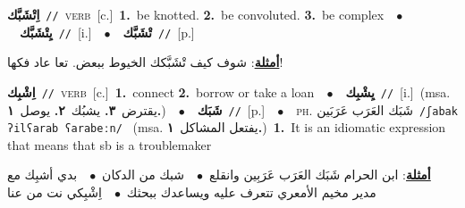\documentclass[10pt,a4paper,twoside]{article} %
\begin{document}
\begin{multicols}{2}
{{{{{{{{{{{{\setlength\topsep{0pt}\textbf{\foreignlanguage{arabic}{اِتْشَبَّك}}\ {\color{gray}\texttt{//}\color{black}}\ \textsc{verb}\ [c.]\ \textbf{1.}~be knotted.  \textbf{2.}~be convoluted.  \textbf{3.}~be complex\ \ $\bullet$\ \ \setlength\topsep{0pt}\textbf{\foreignlanguage{arabic}{يِتْشَبَّك}}\ {\color{gray}\texttt{//}\color{black}}\ [i.]\ \ $\bullet$\ \ \setlength\topsep{0pt}\textbf{\foreignlanguage{arabic}{تْشَبَّك}}\ {\color{gray}\texttt{//}\color{black}}\ [p.]\  \begin{flushright}\color{gray}\foreignlanguage{arabic}{\textbf{\underline{\foreignlanguage{arabic}{أمثلة}}}: شوف كيف تْشَبَّكك الخيوط ببعض. تعا عاد فكها!}\end{flushright}\color{black}} \vspace{2mm}

{\setlength\topsep{0pt}\textbf{\foreignlanguage{arabic}{اِشْبِك}}\ {\color{gray}\texttt{//}\color{black}}\ \textsc{verb}\ [c.]\ \textbf{1.}~connect  \textbf{2.}~borrow or take a loan\ \ $\bullet$\ \ \setlength\topsep{0pt}\textbf{\foreignlanguage{arabic}{يِشْبِك}}\ {\color{gray}\texttt{//}\color{black}}\ [i.]\ \color{gray}(msa. \foreignlanguage{arabic}{يقترض}~\foreignlanguage{arabic}{\textbf{٣.}}  \foreignlanguage{arabic}{يشبُك}~\foreignlanguage{arabic}{\textbf{٢.}}  \foreignlanguage{arabic}{يوصل}~\foreignlanguage{arabic}{\textbf{١.}})\color{black}\ \ $\bullet$\ \ \setlength\topsep{0pt}\textbf{\foreignlanguage{arabic}{شَبَك}}\ {\color{gray}\texttt{//}\color{black}}\ [p.]\ \ $\bullet$\ \ \textsc{ph.} \color{gray} \foreignlanguage{arabic}{شَبَك العَرَب عَرَبَين}\color{black}\ {\color{gray}\texttt{/{\sffamily ʃabak ʔilʕarab ʕarabeːn}/}\color{black}}\ \color{gray} (msa. \foreignlanguage{arabic}{يفتعل المشاكل}~\foreignlanguage{arabic}{\textbf{١.}})\color{black}\ \textbf{1.}~It is an idiomatic expression that means that sb is a troublemaker\  \begin{flushright}\color{gray}\foreignlanguage{arabic}{\textbf{\underline{\foreignlanguage{arabic}{أمثلة}}}: ابن الحرام شَبَك العَرَب عَرَبِين وانقلع\ $\bullet$\ \  شبك من الدكان\ $\bullet$\ \  بدي أشبِك مع مدير مخيم الأمعري تتعرف عليه ويساعدك ببحثك\ $\bullet$\ \  اِشْبِكي نت من عنا}\end{flushright}\color{black}} \vspace{2mm}

}}}}}}}}}}}
\end{multicols}
\end{document}
